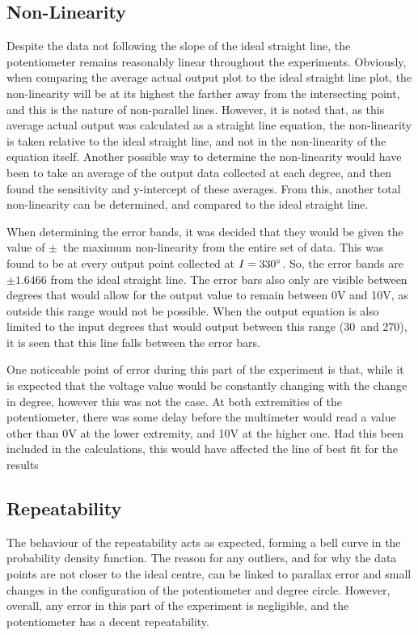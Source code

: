 \documentclass[a4,11pt]{article}
\begin{document}
\subsection{Non-Linearity}
Despite the data not following the slope of the ideal straight line, the potentiometer remains reasonably linear throughout the experiments. Obviously, when comparing the average actual output plot to the ideal straight line plot, the non-linearity will be at its highest the farther away from the intersecting point, and this is the nature of non-parallel lines. However, it is noted that, as this average actual output was calculated as a straight line equation, the non-linearity is taken relative to the ideal straight line, and not in the non-linearity of the equation itself. Another possible way to determine the non-linearity would have been to take an average of the output data collected at each degree, and then found the sensitivity and y-intercept of these averages. From this, another total non-linearity can be determined, and compared to the ideal straight line.	

When determining the error bands, it was decided that they would be given the value of $\pm$\ the maximum non-linearity from the entire set of data. This was found to be at every output point collected at $I=330\degree$. So, the error bands are $\pm1.6466$ from the ideal straight line. The error bars also only are visible between degrees that would allow for the output value to remain between 0V and 10V, as outside this range would not be possible. When the output equation is also limited to the input degrees that would output between this range (30\degree\ and 270\degree), it is seen that this line falls between the error bars.

One noticeable point of error during this part of the experiment is that, while it is expected that the voltage value would be constantly changing with the change in degree, however this was not the case. At both extremities of the potentiometer, there was some delay before the multimeter would read a value other than 0V at the lower extremity, and 10V at the higher one. Had this been included in the calculations, this would have affected the line of best fit for the results
\subsection{Repeatability}
The behaviour of the repeatability acts as expected, forming a bell curve in the probability density function. The reason for any outliers, and for why the data points are not closer to the ideal centre, can be linked to parallax error and small changes in the configuration of the potentiometer and degree circle. However, overall, any error in this part of the experiment is negligible, and the potentiometer has a decent repeatability.
\end{document}
